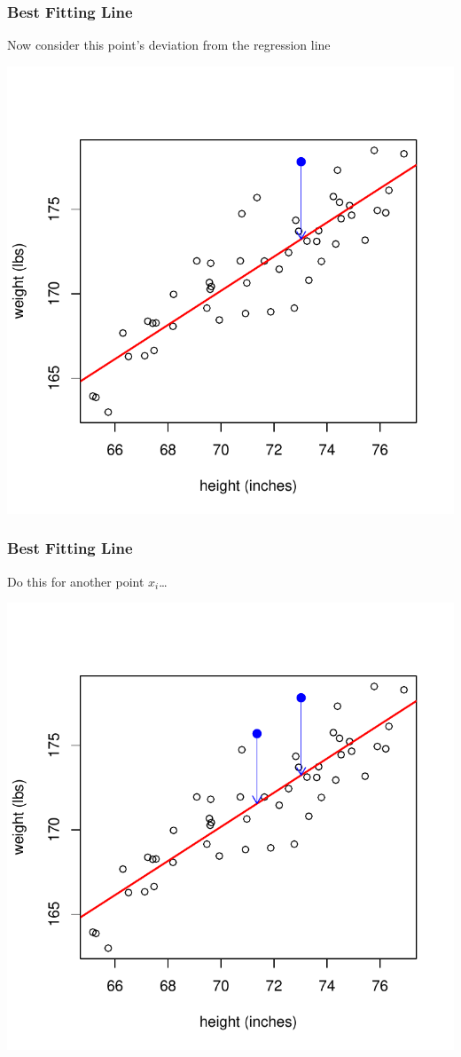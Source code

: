 \documentclass[handout]{beamer}
\newcommand{\blue}[1]{\textcolor{blue2}{#1}}
\begin{document}
\begin{frame}
\frametitle{Best Fitting Line}
Now consider this point's deviation from the \blue{regression line}
\begin{center}
\includegraphics{figure/lec24-005}
\end{center}
\end{frame}
\begin{frame}
\frametitle{Best Fitting Line}
Do this for another point $x_i$\ldots
\begin{center}
\includegraphics{figure/lec24-006}
\end{center}
\end{frame}
\end{document}
